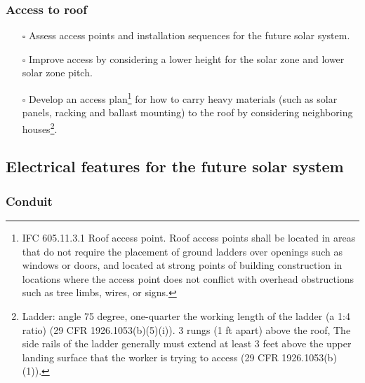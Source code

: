 \documentclass[]{article}
\providecommand{\tightlist}{%
  \setlength{\itemsep}{0pt}\setlength{\parskip}{0pt}}
\let\rmarkdownfootnote\footnote%
\def\footnote{\protect\rmarkdownfootnote}
\begin{document}
\hypertarget{access-to-roof}{%
\subsubsection{Access to roof}\label{access-to-roof}}

\begin{itemize}
\tightlist
\item[$\square$]
  Assess access points and installation sequences for the future solar
  system.
\item[$\square$]
  Improve access by considering a lower height for the solar zone and
  lower solar zone pitch.
\item[$\square$]
  Develop an access plan\footnote{IFC 605.11.3.1 Roof access point. Roof
    access points shall be located in areas that do not require the
    placement of ground ladders over openings such as windows or doors,
    and located at strong points of building construction in locations
    where the access point does not conflict with overhead obstructions
    such as tree limbs, wires, or signs.} for how to carry heavy
  materials (such as solar panels, racking and ballast mounting) to the
  roof by considering neighboring houses\footnote{Ladder: angle 75
    degree, one-quarter the working length of the ladder (a 1:4 ratio)
    (29 CFR 1926.1053(b)(5)(i)). 3 rungs (1 ft apart) above the roof,
    The side rails of the ladder generally must extend at least 3 feet
    above the upper landing surface that the worker is trying to access
    (29 CFR 1926.1053(b)(1)).}.
\end{itemize}

\hypertarget{electrical-features-for-the-future-solar-system}{%
\subsection{Electrical features for the future solar
system}\label{electrical-features-for-the-future-solar-system}}

\hypertarget{conduit}{%
\subsubsection{Conduit}\label{conduit}}
\end{document}
